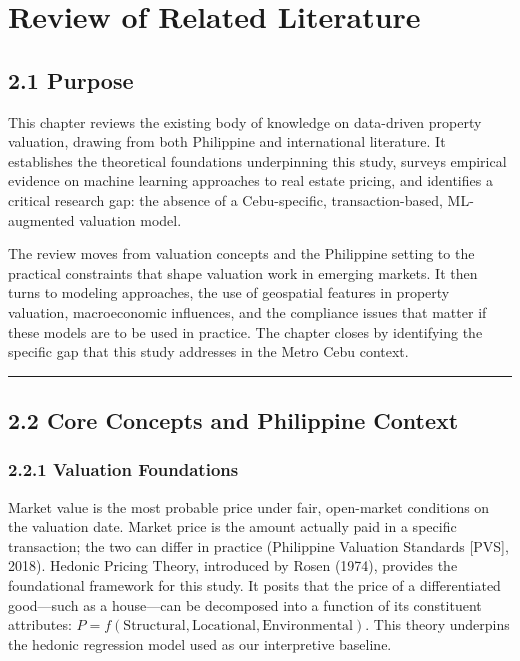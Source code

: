 \section{Review of Related Literature}\label{review-of-related-literature}

\subsection{\texorpdfstring{\textbf{2.1 Purpose}}{2.1 Purpose}}\label{purpose}

This chapter reviews the existing body of knowledge on data-driven property valuation, drawing from both Philippine and international literature. It establishes the theoretical foundations underpinning this study, surveys empirical evidence on machine learning approaches to real estate pricing, and identifies a critical research gap: the absence of a Cebu-specific, transaction-based, ML-augmented valuation model.

The review moves from valuation concepts and the Philippine setting to the practical constraints that shape valuation work in emerging markets. It then turns to modeling approaches, the use of geospatial features in property valuation, macroeconomic influences, and the compliance issues that matter if these models are to be used in practice. The chapter closes by identifying the specific gap that this study addresses in the Metro Cebu context.

\begin{center}\rule{0.5\linewidth}{0.5pt}\end{center}

\subsection{\texorpdfstring{\textbf{2.2 Core Concepts and Philippine Context}}{2.2 Core Concepts and Philippine Context}}\label{core-concepts-and-philippine-context}

\subsubsection{\texorpdfstring{\textbf{2.2.1 Valuation Foundations}}{2.2.1 Valuation Foundations}}\label{valuation-foundations}

Market value is the most probable price under fair, open-market conditions on the valuation date. Market price is the amount actually paid in a specific transaction; the two can differ in practice (Philippine Valuation Standards [PVS], 2018). Hedonic Pricing Theory, introduced by Rosen (1974), provides the foundational framework for this study. It posits that the price of a differentiated good---such as a house---can be decomposed into a function of its constituent attributes: $P = f(\text{Structural}, \text{Locational}, \text{Environmental})$. This theory underpins the hedonic regression model used as our interpretive baseline.

